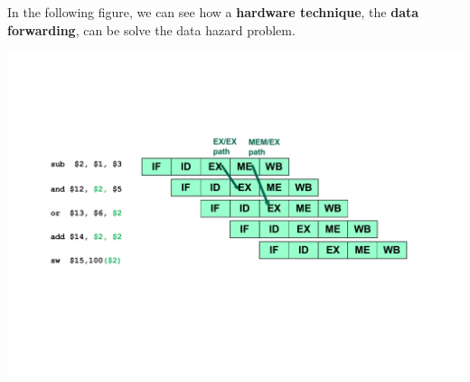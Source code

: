 \documentclass[a4paper]{article}
\begin{document}
    \begin{examplebox}\label{example: data forwarding}
        In the following figure, we can see how a \textbf{hardware technique}, the \textbf{data forwarding}, can be solve the data hazard problem.
        \begin{center}
            \includegraphics[width=\textwidth]{img/data-forwarding-1.pdf}
        \end{center}
    \end{examplebox}

    \newpage

    {}
    

    \newpage

    \printindex
\end{document}
